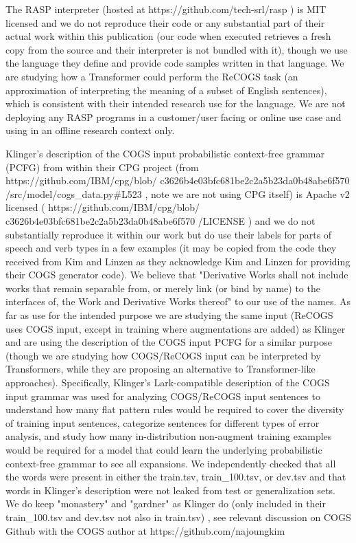 \documentclass[11pt]{article}
\begin{document}
The RASP \cite{Weiss2021} interpreter (hosted at https://github.com/tech-srl/rasp ) is MIT licensed and we do not reproduce their code or any substantial part of their actual work within this publication (our code when executed retrieves a fresh copy from the source and their interpreter is not bundled with it), though we use the language they define and provide code samples written in that language. We are studying how a Transformer could perform the ReCOGS task (an approximation of interpreting the meaning of a subset of English sentences), which is consistent with their intended research use for the language. We are not deploying any RASP programs in a customer/user facing or online use case and using in an offline research context only.
 
Klinger's description of the COGS input probabilistic context-free grammar (PCFG) from within their CPG project (from https://github.com/IBM/cpg/blob/
c3626b4e03bfc681be2c2a5b23da0b48abe6f570
/src/model/cogs\_data.py\#L523 , note we are not using CPG itself) is Apache v2 licensed ( https://github.com/IBM/cpg/blob/
c3626b4e03bfc681be2c2a5b23da0b48abe6f570
/LICENSE ) and we do not substantially reproduce it within our work but do use their labels for parts of speech and verb types in a few examples (it may be copied from the code they received from Kim and Linzen as they acknowledge Kim and Linzen for providing their COGS generator code). We believe that "Derivative Works shall not include works that remain separable from, or merely link (or bind by name) to the interfaces of, the Work and Derivative Works thereof" to our use of the names. As far as use for the intended purpose we are studying the same input (ReCOGS uses COGS input, except in training where augmentations are added) as Klinger and are using the description of the COGS input PCFG for a similar purpose (though we are studying how COGS/ReCOGS input can be interpreted by Transformers, while they are proposing an alternative to Transformer-like approaches). Specifically, Klinger's Lark-compatible description of the COGS input grammar was used for analyzing COGS/ReCOGS input sentences to understand how many flat pattern rules would be required to cover the diversity of training input sentences, categorize sentences for different types of error analysis, and study how many in-distribution non-augment training examples would be required for a model that could learn the underlying probabilistic context-free grammar to see all expansions. We independently checked that all the words were present in either the train.tsv, train\_100.tsv, or dev.tsv and that words in Klinger's description were not leaked from test or generalization sets. We do keep "monastery" and "gardner" as Klinger do (only included in their train\_100.tsv and dev.tsv not also in train.tsv) , see relevant discussion on COGS Github with the COGS author at https://github.com/najoungkim
\end{document}
